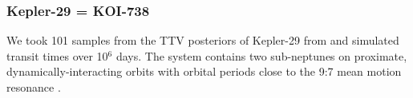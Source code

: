 \documentclass{aastex62}
\begin{document}

\subsubsection{Kepler-29 = KOI-738}
We took 101 samples from the TTV posteriors of Kepler-29 from \cite{Jontof:2021} and simulated transit times over 10$^6$ days. The system contains two sub-neptunes on proximate, dynamically-interacting orbits with orbital periods close to the 9:7 mean motion resonance \citep{Migaszewski:2017}. 

\end{document}
